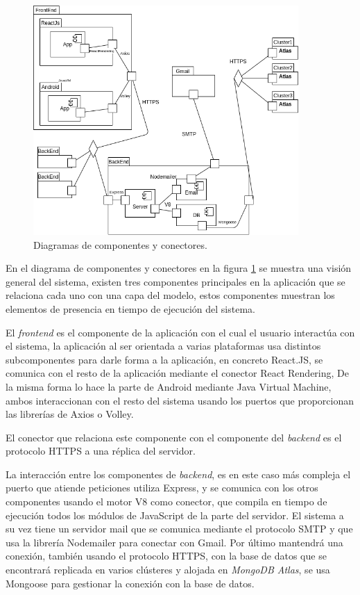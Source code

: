 \documentclass{article}
\begin{document}
\begin{figure}[H]
   \centering
       \includegraphics[width=0.90\textwidth]{../images/cyc.png}
   \caption{Diagramas de componentes y conectores.}
   \label{cyc}
\end{figure}
 
En el diagrama de componentes y conectores en la figura \ref{cyc} se muestra una visión general del sistema, existen tres componentes principales en la aplicación que se relaciona cada uno con una capa del modelo, estos componentes muestran los elementos de presencia en tiempo de ejecución del sistema.
 
El \textit{frontend} es el componente de la aplicación con el cual el usuario interactúa con el sistema, la aplicación al ser orientada a varias plataformas usa distintos subcomponentes para darle forma a la aplicación, en concreto React.JS, se comunica con el resto de la aplicación mediante el conector React Rendering, De la misma forma lo hace la parte de Android mediante Java Virtual Machine, ambos interaccionan con el resto del sistema usando los puertos que proporcionan las librerías de Axios o Volley.
 
El conector que relaciona este componente con el componente del \textit{backend} es el protocolo HTTPS a una réplica del servidor.
 
La interacción entre los componentes de \textit{backend}, es en este caso más compleja el puerto que atiende peticiones utiliza Express, y se comunica con los otros componentes usando el motor V8 como conector, que compila en tiempo de ejecución todos los módulos de JavaScript de la parte del servidor. El sistema a su vez tiene un servidor mail que se comunica mediante el protocolo SMTP y que usa la librería Nodemailer para conectar con Gmail. Por último mantendrá una conexión, también usando el protocolo HTTPS, con la base de datos que se encontrará replicada en varios clústeres y alojada en \textit{MongoDB Atlas}, se usa Mongoose para gestionar la conexión con la base de datos.
 
\end{document}
